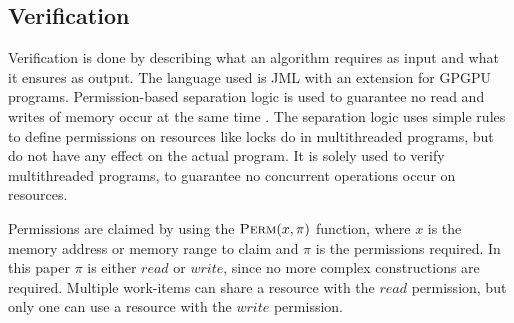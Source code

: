 \subsection{Verification}
Verification is done by describing what an algorithm requires as input and what it ensures as output.
The language used is JML with an extension for GPGPU programs.
Permission-based separation logic is used to guarantee no read and writes of memory occur at the same time \cite{vercors}.
The separation logic uses simple rules to define permissions on resources like locks do in multithreaded programs, but do not have any effect on the actual program.
It is solely used to verify multithreaded programs, to guarantee no concurrent operations occur on resources.

Permissions are claimed by using the $\textproc{Perm}(x, \pi)$ function, where $x$ is the memory address or memory range to claim and $\pi$ is the permissions required.
In this paper $\pi$ is either $read$ or $write$, since no more complex constructions are required.
Multiple work-items can share a resource with the $read$ permission, but only one can use a resource with the $write$ permission.
